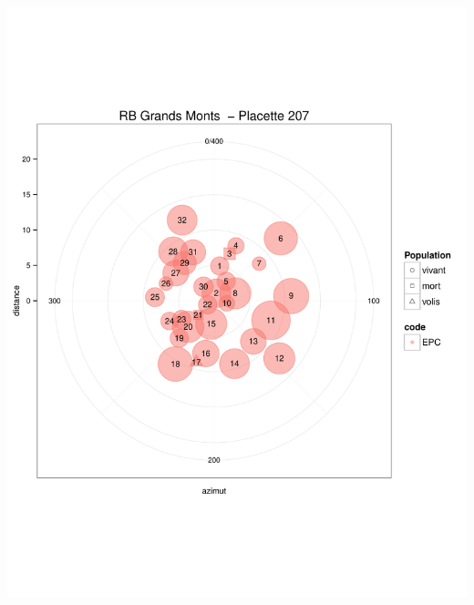 \documentclass[a4paper]{book}\usepackage[]{graphicx}\usepackage[]{color}
\makeatletter
\def\maxwidth{ %
  \ifdim\Gin@nat@width>\linewidth
    \linewidth
  \else
    \Gin@nat@width
  \fi
}
\newenvironment{knitrout}{}{} %
\makeatother
\begin{document}
\begin{knitrout}
{\centering \includegraphics[width=\maxwidth]{Figures/PlanArbres-19} 

}





\end{knitrout}
\end{document}
